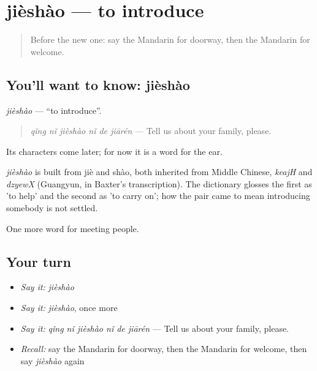 \section[jièshào]{jièshào — to introduce}

\label{lesson:ZH-C74-jieshao}



\begin{quote}
Before the new one: say the Mandarin for doorway, then the Mandarin for welcome.
\end{quote}

\subsection*{You'll want to know: jièshào}
\emph{jièshào} — \textquotedblleft{}to introduce\textquotedblright{}.

\begin{quote}
\emph{qǐng nǐ jièshào nǐ de jiārén} — Tell us about your family, please.
\end{quote}

Its characters come later; for now it is a word for the ear.

\begin{cousinweb}
\emph{jièshào} is built from jiè and shào, both inherited from Middle Chinese, \emph{keajH} and \emph{dzyewX} (Guangyun, in Baxter's transcription). The dictionary glosses the first as 'to help' and the second as 'to carry on'; how the pair came to mean introducing somebody is not settled.
\end{cousinweb}

\begin{grammarlens}[title={What you've built}]
One more word for meeting people.
\end{grammarlens}

\subsection*{Your turn}
\begin{itemize}
\raggedright
  \item \emph{Say it:} \emph{jièshào}
  \item \emph{Say it:} \emph{jièshào}, once more
  \item \emph{Say it:} \emph{qǐng nǐ jièshào nǐ de jiārén} — Tell us about your family, please.
  \item \emph{Recall:} say the Mandarin for doorway, then the Mandarin for welcome, then say \emph{jièshào} again
\end{itemize}

